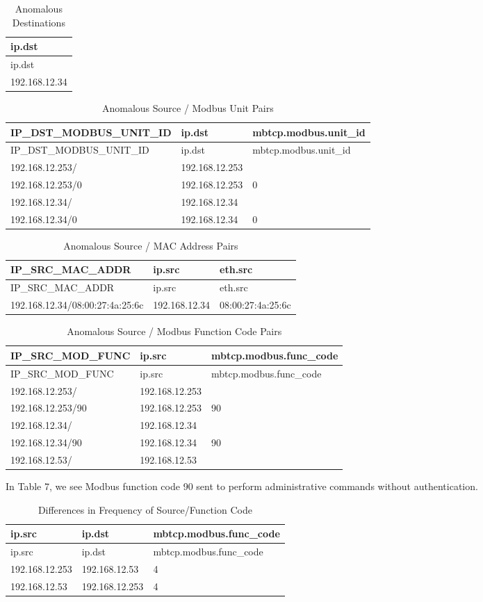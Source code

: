 \documentclass[11pt,]{article}
\begin{document}
\begin{longtable}[c]{@{}l@{}}
\caption{Anomalous Destinations}\tabularnewline
\toprule
ip.dst\tabularnewline
\midrule
\endfirsthead
\toprule
ip.dst\tabularnewline
\midrule
\endhead
192.168.12.34\tabularnewline
\bottomrule
\end{longtable}

\begin{longtable}[c]{@{}lll@{}}
\caption{Anomalous Source / Modbus Unit Pairs}\tabularnewline
\toprule
IP\_DST\_MODBUS\_UNIT\_ID & ip.dst &
mbtcp.modbus.unit\_id\tabularnewline
\midrule
\endfirsthead
\toprule
IP\_DST\_MODBUS\_UNIT\_ID & ip.dst &
mbtcp.modbus.unit\_id\tabularnewline
\midrule
\endhead
192.168.12.253/ & 192.168.12.253 &\tabularnewline
192.168.12.253/0 & 192.168.12.253 & 0\tabularnewline
192.168.12.34/ & 192.168.12.34 &\tabularnewline
192.168.12.34/0 & 192.168.12.34 & 0\tabularnewline
\bottomrule
\end{longtable}

\begin{longtable}[c]{@{}lll@{}}
\caption{Anomalous Source / MAC Address Pairs}\tabularnewline
\toprule
IP\_SRC\_MAC\_ADDR & ip.src & eth.src\tabularnewline
\midrule
\endfirsthead
\toprule
IP\_SRC\_MAC\_ADDR & ip.src & eth.src\tabularnewline
\midrule
\endhead
192.168.12.34/08:00:27:4a:25:6c & 192.168.12.34 &
08:00:27:4a:25:6c\tabularnewline
\bottomrule
\end{longtable}

\begin{longtable}[c]{@{}lll@{}}
\caption{Anomalous Source / Modbus Function Code Pairs}\tabularnewline
\toprule
IP\_SRC\_MOD\_FUNC & ip.src & mbtcp.modbus.func\_code\tabularnewline
\midrule
\endfirsthead
\toprule
IP\_SRC\_MOD\_FUNC & ip.src & mbtcp.modbus.func\_code\tabularnewline
\midrule
\endhead
192.168.12.253/ & 192.168.12.253 &\tabularnewline
192.168.12.253/90 & 192.168.12.253 & 90\tabularnewline
192.168.12.34/ & 192.168.12.34 &\tabularnewline
192.168.12.34/90 & 192.168.12.34 & 90\tabularnewline
192.168.12.53/ & 192.168.12.53 &\tabularnewline
\bottomrule
\end{longtable}

In Table 7, we see Modbus function code 90 sent to perform
administrative commands without authentication.

\begin{longtable}[c]{@{}lll@{}}
\caption{Differences in Frequency of Source/Function
Code}\tabularnewline
\toprule
ip.src & ip.dst & mbtcp.modbus.func\_code\tabularnewline
\midrule
\endfirsthead
\toprule
ip.src & ip.dst & mbtcp.modbus.func\_code\tabularnewline
\midrule
\endhead
192.168.12.253 & 192.168.12.53 & 4\tabularnewline
192.168.12.53 & 192.168.12.253 & 4\tabularnewline
\bottomrule
\end{longtable}
\end{document}
